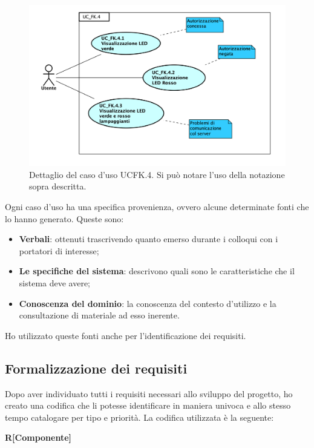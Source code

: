 \begin{figure}[H]
	\begin{center}
	\includegraphics[scale=0.35]{immagini/usecase/UC_FK_4.png}
	\caption{Dettaglio del caso d'uso UC\textunderscore FK.4. Si può notare l'uso della notazione sopra descritta.}
	\end{center}
\end{figure}

Ogni caso d'uso ha una specifica provenienza, ovvero alcune determinate fonti che lo hanno generato.
Queste sono:
\begin{itemize}
\item \textbf{Verbali}: ottenuti trascrivendo quanto emerso durante i colloqui con i portatori di interesse;
\item \textbf{Le specifiche del sistema}: descrivono quali sono le caratteristiche che il sistema deve avere;
\item \textbf{Conoscenza del dominio}: la conoscenza del contesto d'utilizzo e la consultazione di materiale ad esso inerente.
\end{itemize}

Ho utilizzato queste fonti anche per l'identificazione dei requisiti.

\subsection{Formalizzazione dei requisiti}
Dopo aver individuato tutti i requisiti necessari allo sviluppo del progetto, ho creato una codifica che li potesse identificare in maniera univoca e allo stesso tempo catalogare per tipo e priorità.
La codifica utilizzata è la seguente:

\begin{center}
\textbf{R[Componente]\textunderscore [Tipologia]}
\end{center}

